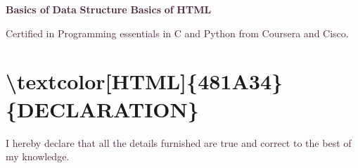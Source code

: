 \documentclass[12pt]{article}%
\begin{document}
%
\begin{flushleft}%
\textcolor[HTML]{481A34}{\textbf{Basics of}}\textcolor[HTML]{481A34}{\textbf{ }}\textcolor[HTML]{481A34}{\textbf{Data}}\textcolor[HTML]{481A34}{\textbf{ }}\textcolor[HTML]{481A34}{\textbf{Structure}}\textcolor[HTML]{481A34}{\textbf{ }}\textcolor[HTML]{481A34}{\textbf{Basics}}\textcolor[HTML]{481A34}{\textbf{ }}\textcolor[HTML]{481A34}{\textbf{of}}\textcolor[HTML]{481A34}{\textbf{ }}\textcolor[HTML]{481A34}{\textbf{HTML}}%
\end{flushleft}%
\newline%
%
\begin{justify}%
\textcolor[HTML]{481A34}{Certified}\textcolor[HTML]{481A34}{ }\textcolor[HTML]{481A34}{in}\textcolor[HTML]{481A34}{ }\textcolor[HTML]{481A34}{Programming}\textcolor[HTML]{481A34}{ }\textcolor[HTML]{481A34}{essentials}\textcolor[HTML]{481A34}{ }\textcolor[HTML]{481A34}{in}\textcolor[HTML]{481A34}{ }\textcolor[HTML]{481A34}{C}\textcolor[HTML]{481A34}{ }\textcolor[HTML]{481A34}{and}\textcolor[HTML]{481A34}{ }\textcolor[HTML]{481A34}{Python}\textcolor[HTML]{481A34}{ }\textcolor[HTML]{481A34}{from}\textcolor[HTML]{481A34}{ }\textcolor[HTML]{481A34}{Coursera}\textcolor[HTML]{481A34}{ }\textcolor[HTML]{481A34}{and}\textcolor[HTML]{481A34}{ }\textcolor[HTML]{481A34}{Cisco.}%
\end{justify}%
\newline%
%
\section{\textbackslash{}textcolor{[}HTML{]}\{481A34\}\{DECLARATION\}}%
\label{sec:sec61}%

%
\begin{justify}%
\textcolor[HTML]{481A34}{I}\textcolor[HTML]{481A34}{ }\textcolor[HTML]{481A34}{hereby}\textcolor[HTML]{481A34}{ }\textcolor[HTML]{481A34}{declare}\textcolor[HTML]{481A34}{ }\textcolor[HTML]{481A34}{that}\textcolor[HTML]{481A34}{ }\textcolor[HTML]{481A34}{all}\textcolor[HTML]{481A34}{ }\textcolor[HTML]{481A34}{the}\textcolor[HTML]{481A34}{ }\textcolor[HTML]{481A34}{details}\textcolor[HTML]{481A34}{ }\textcolor[HTML]{481A34}{furnished}\textcolor[HTML]{481A34}{ }\textcolor[HTML]{481A34}{are}\textcolor[HTML]{481A34}{ }\textcolor[HTML]{481A34}{true}\textcolor[HTML]{481A34}{ }\textcolor[HTML]{481A34}{and}\textcolor[HTML]{481A34}{ }\textcolor[HTML]{481A34}{correct}\textcolor[HTML]{481A34}{ }\textcolor[HTML]{481A34}{to}\textcolor[HTML]{481A34}{ }\textcolor[HTML]{481A34}{the}\textcolor[HTML]{481A34}{ }\textcolor[HTML]{481A34}{best}\textcolor[HTML]{481A34}{ }\textcolor[HTML]{481A34}{of}\textcolor[HTML]{481A34}{ }\textcolor[HTML]{481A34}{my}\textcolor[HTML]{481A34}{ }\textcolor[HTML]{481A34}{knowledge.}%
\end{justify}%
\newline%
%
\end{document}
